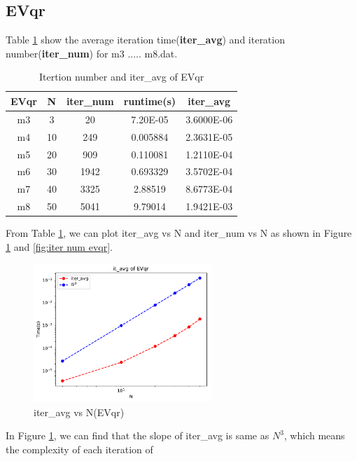 \documentclass{article}
\begin{document}
\subsection{EVqr}
Table \ref{tab:iter evqr} show the average iteration time(\textbf{iter\_avg}) and iteration number(\textbf{iter\_num})
for m3 ..... m8.dat.
\begin{table}[H]
    \begin{center}
        \begin{tabular}{|c|c|c|c|c|}
            \hline
            EVqr & N & iter\_num & runtime(s) & iter\_avg \\ \hline
            m3 & 3 & 20 & 7.20E-05 & 3.6000E-06 \\ \hline
            m4 & 10 & 249 & 0.005884 & 2.3631E-05 \\ \hline
            m5 & 20 & 909 & 0.110081 & 1.2110E-04 \\ \hline
            m6 & 30 & 1942 & 0.693329 & 3.5702E-04 \\ \hline
            m7 & 40 & 3325 & 2.88519 & 8.6773E-04 \\ \hline
            m8 & 50 & 5041 & 9.79014 & 1.9421E-03 \\ \hline
        \end{tabular}
    \end{center}
    \caption{Itertion number and iter\_avg of EVqr}
    \label{tab:iter evqr}
\end{table}
From Table \ref{tab:iter evqr}, we can plot iter\_avg vs N and iter\_num vs N as shown in Figure \ref{fig:iter avg evqr} and \ref{fig:iter num evqr}.
\begin{figure}[H]
    \centering
    \includegraphics[width=0.6\textwidth]{src/iter_avg_unshifted.pdf}
    \caption{iter\_avg vs N(EVqr)}
    \label{fig:iter avg evqr}
\end{figure}
In Figure \ref{fig:iter avg evqr}, we can find that the slope of iter\_avg is same as $N^3$, which means the complexity of each iteration of
\end{document}

